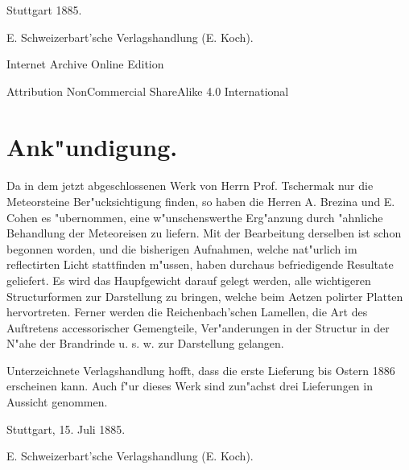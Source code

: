 \documentclass[a4paper, 11pt, oneside, polutonikogreek, german]{article}
\begin{document}
\begin{titlepage}
		
	\vspace*{\fill}%
	
	Stuttgart 1885. %
	
	{\small E. Schweizerbart'sche Verlagshandlung (E. Koch).} %

	\vspace{1\baselineskip} %

    Internet Archive Online Edition  %
	
	{\small Attribution NonCommercial ShareAlike 4.0 International } %
\end{titlepage}
\setlength{\parskip}{1mm plus1mm minus1mm}
\setcounter{tocdepth}{3}
\setcounter{secnumdepth}{3}
\pagestyle{fancy}
\fancyhf{}
\cfoot{\swabfamily{\thepage}}
\Large
\tableofcontents
\clearpage
\section{Ank"undigung.}
\paragraph*{}
Da in dem jetzt abgeschlossenen Werk von Herrn Prof. Tschermak nur die Meteorsteine Ber"ucksichtigung finden, so haben die Herren A. Brezina und E. Cohen es "ubernommen, eine w"unschenswerthe Erg"anzung durch "ahnliche Behandlung der Meteoreisen zu liefern. Mit der Bearbeitung derselben ist schon begonnen worden, und die bisherigen Aufnahmen, welche nat"urlich im reflectirten Licht stattfinden m"ussen, haben durchaus befriedigende Resultate geliefert. Es wird das Haupfgewicht darauf gelegt werden, alle wichtigeren Structurformen zur Darstellung zu bringen, welche beim Aetzen polirter Platten hervortreten. Ferner werden die Reichenbach'schen Lamellen, die Art des Auftretens accessorischer Gemengteile, Ver"anderungen in der Structur in der N"ahe der Brandrinde u. s. w. zur Darstellung gelangen.

Unterzeichnete Verlagshandlung hofft, dass die erste Lieferung bis Ostern 1886 erscheinen kann. Auch f"ur dieses Werk sind zun"achst drei Lieferungen in Aussicht genommen.

Stuttgart, 15. Juli 1885.

\bigskip

E. Schweizerbart'sche Verlagshandlung (E. Koch).
\clearpage
\end{document}
